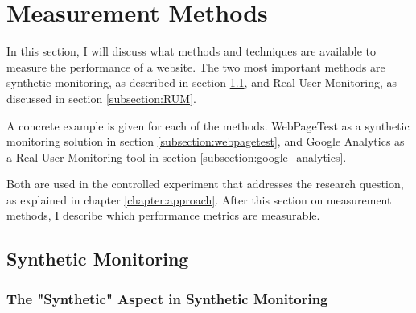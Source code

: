 





\section{Measurement Methods} %
\label{section:measurement_methods}

In this section, I will discuss what methods and techniques are available to measure the performance of a website.
The two most important methods are synthetic monitoring, as described in section \ref{subsection:synthetic_monitoring}, and Real-User Monitoring, as discussed in section \ref{subsection:RUM}.

A concrete example is given for each of the methods.
WebPageTest as a synthetic monitoring solution in section \ref{subsection:webpagetest},
and Google Analytics as a Real-User Monitoring tool in section \ref{subsection:google_analytics}.

Both are used in the controlled experiment that addresses the research question, as explained in chapter \ref{chapter:approach}.
After this section on measurement methods, I describe which performance metrics are measurable.




\subsection{Synthetic Monitoring}
\label{subsection:synthetic_monitoring}


\subsubsection{The "Synthetic" Aspect in Synthetic Monitoring} %

